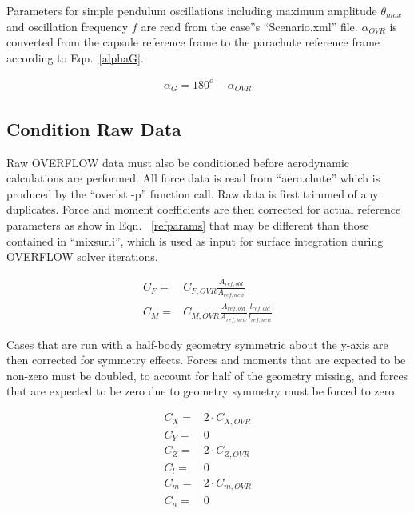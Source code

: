 \documentclass[]{aiaa-tc}%
\begin{document}
Parameters for simple pendulum oscillations including maximum amplitude $\theta_{max}$ and oscillation frequency $f$ are read from the case''s ``Scenario.xml'' file.  $\alpha_{OVR}$ is converted from the capsule reference frame to the parachute reference frame according to Eqn.~\ref{alphaG}.

\begin{equation}
\begin{split}
\alpha_G = 180^o - \alpha_{OVR}
\end{split}
\label{alphaG}
\end{equation}


\subsection{Condition Raw Data}

Raw OVERFLOW data must also be conditioned before aerodynamic calculations are performed.  All force data is read from ``aero.chute'' which is produced by the ``overlst -p'' function call.  Raw data is first trimmed of any duplicates.  Force and moment coefficients are then corrected for actual reference parameters as show in Eqn. ~\ref{refparams} that may be different than those contained in ``mixsur.i'', which is used as input for surface integration during OVERFLOW solver iterations.

\begin{equation}
\begin{split}
C_{F} =& C_{F,OVR} \frac{A_{ref,old}}{A_{ref,new}} \\
C_{M} =& C_{M,OVR} \frac{A_{ref,old}}{A_{ref,new}} \frac{l_{ref,old}}{l_{ref,new}}
\end{split}
\label{refparams}
\end{equation}

Cases that are run with a half-body geometry symmetric about the y-axis are then corrected for symmetry effects.  Forces and moments that are expected to be non-zero must be doubled, to account for half of the geometry missing, and forces that are expected to be zero due to geometry symmetry must be forced to zero.

\begin{equation}
\begin{split}
C_{X} =& 2 \cdot C_{X,OVR} \\
C_{Y} =& 0           \\
C_{Z} =& 2 \cdot C_{Z,OVR} \\
C_{l} =& 0           \\
C_{m} =& 2 \cdot C_{m,OVR} \\
C_{n} =& 0           \\
\end{split}
\label{refparams}
\end{equation}
\end{document}
